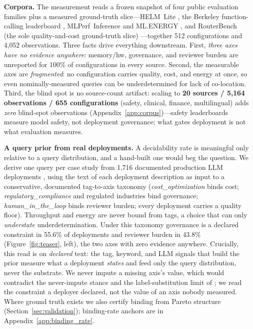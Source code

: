\documentclass{article} %
\begin{document}
\textbf{Corpora.}
The measurement reads a frozen snapshot of four public evaluation families plus a measured ground-truth slice---HELM~Lite \citep{liang2022helm}, the Berkeley function-calling leaderboard \citep{patil2023gorilla}, MLPerf~Inference and ML.ENERGY \citep{reddi2020mlperf,chung2025mlenergy}, and RouterBench (the sole quality-and-cost ground-truth slice) \citep{hu2024routerbench}---together 512 configurations and 4{,}052 observations. Three facts drive everything downstream. First, \emph{three axes have no evidence anywhere}: memory/hw, governance, and reviewer burden are unreported for 100\% of configurations in every source. Second, the measurable axes are \emph{fragmented}: no configuration carries quality, cost, and energy at once, so even nominally-measured queries can be underdetermined for lack of co-location. Third, the blind spot is no source-count artifact: scaling to \textbf{20 sources / 5{,}164 observations / 655 configurations} (safety, clinical, finance, multilingual) adds \emph{zero} blind-spot observations (Appendix~\ref{app:corpus})---safety leaderboards measure model safety, not deployment governance; what gates deployment is not what evaluation measures.

\textbf{A query prior from real deployments.}
A decidability rate is meaningful only relative to a query distribution, and a hand-built one would beg the question. We derive one query per case study from 1{,}716 documented production LLM deployments \citep{zenml2024llmops}, using the text of each deployment description as input to a conservative, documented tag-to-axis taxonomy (\emph{cost\_optimization} binds cost; \emph{regulatory\_compliance} and regulated industries bind governance; \emph{human\_in\_the\_loop} binds reviewer burden; every deployment carries a quality floor). Throughput and energy are never bound from tags, a choice that can only \emph{understate} underdetermination. Under this taxonomy governance is a declared constraint in 55.6\% of deployments and reviewer burden in 43.8\% (Figure~\ref{fig:teaser}, left), the two axes with zero evidence anywhere. Crucially, this read is on \emph{declared} text: the tag, keyword, and LLM signals that build the prior measure what a deployment \emph{states} and feed only the query distribution, never the substrate. We never impute a missing axis's value, which would contradict the never-impute stance and the label-substitution limit of \citet{dorner2025limits}; we read the constraint a deployer declared, not the value of an axis nobody measured. Where ground truth exists we also certify binding from Pareto structure (Section~\ref{sec:validation}); binding-rate anchors are in Appendix~\ref{app:binding_rate}.
\end{document}
